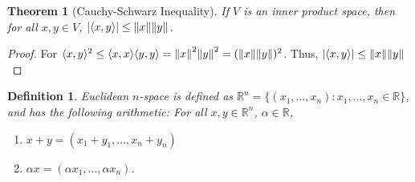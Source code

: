 \documentclass[12pt,oneside]{book}
\theoremstyle{mystyle}
\newtheorem{theorem}{Theorem}[section]
\newtheorem{definition}{Definition}[section]
\begin{document}
\begin{theorem}[Cauchy-Schwarz Inequality]
If $V$ is an inner product space, then for all $x,y \in V$, $|\langle x,y\rangle| \leq \norm{x} \norm{y}$.
\end{theorem}
\begin{proof}
For $\langle x,y \rangle^2 \leq \langle x,x \rangle \langle y,y \rangle = \norm{x}^2 \norm{y}^2 = (\norm{x}\norm{y})^2$. Thus, $|\langle x,y \rangle| \leq \norm{x}\norm{y}$
\end{proof}

\begin{definition}
Euclidean $n$-space is defined as $\mathbb{R}^n=\{(x_1,\hdots, x_n):x_1,\hdots, x_n \in \mathbb{R}\}$, and has the following arithmetic: For all $x,y\in \mathbb{R}^n$, $\alpha \in \mathbb{R}$,
\begin{enumerate}
\item $x+y = (x_1+y_1,\hdots, x_n+y_n)$
\item $\alpha x = (\alpha x_1,\hdots, \alpha x_n)$.
\end{enumerate}
\end{definition}
\end{document}
